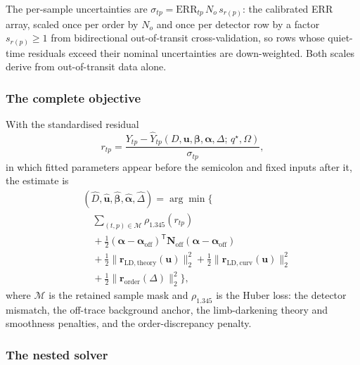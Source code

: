 The per-sample uncertainties are
$\sigma_{tp}=\mathrm{ERR}_{tp}\,N_o\,s_{r(p)}$: the calibrated ERR array,
scaled once per order by $N_o$ and once per detector row by a factor
$s_{r(p)}\geq 1$ from bidirectional out-of-transit cross-validation, so
rows whose quiet-time residuals exceed their nominal uncertainties are
down-weighted. Both scales derive from out-of-transit data alone.

\subsubsection{The complete objective}


With the standardised residual
\begin{equation}
 r_{tp}=\frac{Y_{tp}-\widehat Y_{tp}
 (D,\bm{u},\bm{\beta},\bm{\alpha},\Delta;\,q^\star,\Omega)}{\sigma_{tp}},
 \label{eq:residual}
\end{equation}
in which fitted parameters appear before the semicolon and fixed inputs
after it, the estimate is
\begin{equation}
\begin{split}
 &(\widehat D,\widehat{\bm{u}},\widehat{\bm{\beta}},
  \widehat{\bm{\alpha}},\widehat\Delta)
 = \arg\min\Big\{ \\
 &\quad\sum_{(t,p)\in\mathcal{M}}\rho_{1.345}(r_{tp}) \\
 &\quad+\tfrac{1}{2}(\bm{\alpha}-\bm{\alpha}_{\mathrm{off}})^{\mathsf T}
   \bm{N}_{\mathrm{off}}(\bm{\alpha}-\bm{\alpha}_{\mathrm{off}}) \\
 &\quad+\tfrac{1}{2}\|\bm{r}_{\mathrm{LD,theory}}(\bm{u})\|_2^2
  +\tfrac{1}{2}\|\bm{r}_{\mathrm{LD,curv}}(\bm{u})\|_2^2 \\
 &\quad+\tfrac{1}{2}\|\bm{r}_{\mathrm{order}}(\Delta)\|_2^2
 \Big\},
\end{split}
 \label{eq:objective}
\end{equation}
where $\mathcal{M}$ is the retained sample mask and $\rho_{1.345}$ is the
Huber loss: the detector mismatch, the off-trace background anchor, the
limb-darkening theory and smoothness penalties, and the order-discrepancy
penalty.

\subsubsection{The nested solver}

